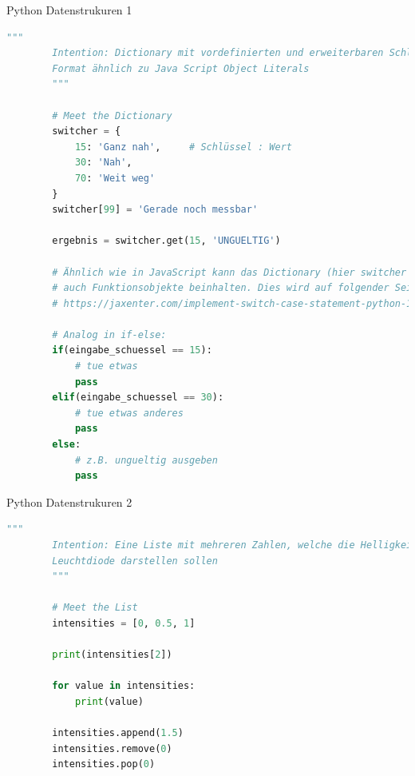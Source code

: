 \begin{frame}[fragile]{Python Datenstrukuren 1}
    \begin{lstlisting}[language=Python, gobble=8]
        """
        Intention: Dictionary mit vordefinierten und erweiterbaren Schlüsseln,
        Format ähnlich zu Java Script Object Literals
        """

        # Meet the Dictionary
        switcher = {
            15: 'Ganz nah',     # Schlüssel : Wert
            30: 'Nah',
            70: 'Weit weg'
        }
        switcher[99] = 'Gerade noch messbar'

        ergebnis = switcher.get(15, 'UNGUELTIG')

        # Ähnlich wie in JavaScript kann das Dictionary (hier switcher genannt)
        # auch Funktionsobjekte beinhalten. Dies wird auf folgender Seite erklärt:
        # https://jaxenter.com/implement-switch-case-statement-python-138315.html

        # Analog in if-else:
        if(eingabe_schuessel == 15):
            # tue etwas
            pass
        elif(eingabe_schuessel == 30):
            # tue etwas anderes
            pass
        else:
            # z.B. ungueltig ausgeben
            pass
    \end{lstlisting}
\end{frame}

\begin{frame}[fragile]{Python Datenstrukuren 2}
    \begin{lstlisting}[language=Python, gobble=8]
        """
        Intention: Eine Liste mit mehreren Zahlen, welche die Helligkeit einer
        Leuchtdiode darstellen sollen
        """

        # Meet the List
        intensities = [0, 0.5, 1]

        print(intensities[2])

        for value in intensities:
            print(value)

        intensities.append(1.5)
        intensities.remove(0)
        intensities.pop(0)
    \end{lstlisting}
\end{frame}

